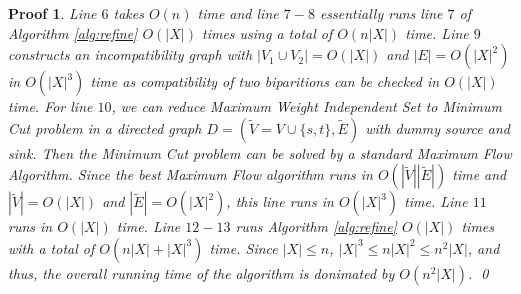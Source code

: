 \documentclass[twocolumn]{bmcart}%
\theoremstyle{mystyle}
\theoremstyle{proofstyle}
\newtheorem*{proof2}{Proof}
\newenvironment{proofnospace}{\begin{proof2}}{\qed \end{proof2}}
\begin{document}
\begin{proofnospace}
Line $6$ takes $O(n)$ time and line $7-8$ essentially runs line $7$ of Algorithm \ref{alg:refine} $O(|X|)$ times using a total of $O(n|X|)$ time. Line $9$ constructs an incompatibility graph with $|V_1\cup V_2| = O(|X|)$ and $|E| = O(|X|^2)$ in $O(|X|^3)$ time as compatibility of two biparitions can be checked in $O(|X|)$ time. For line $10$, we can reduce Maximum Weight Independent Set to Minimum Cut problem in a directed graph $D = (\tilde{V} = V \cup \{s,t\}, \tilde{E})$ with dummy source and sink. Then the Minimum Cut problem can be solved by a standard Maximum Flow Algorithm. Since the best Maximum Flow algorithm runs in $O(|\tilde{V}||\tilde{E}|)$ time and $|\tilde{V}| = O(|X|)$ and $|\tilde{E}| = O(|X|^2)$, this line runs in $O(|X|^3)$ time. Line $11$ runs in $O(|X|)$ time. Line $12-13$ runs Algorithm \ref{alg:refine} $O(|X|)$ times with a total of $O(n|X|+|X|^3)$ time. Since $|X| \le n$, $|X|^3 \le n|X|^2 \le n^2|X|$, and thus, the overall running time of the algorithm is donimated by $O(n^2|X|)$.
\end{proofnospace}
\end{document}
